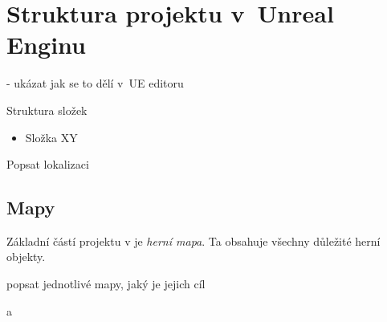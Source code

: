 
\section{Struktura projektu v~Unreal Enginu}
\label{sec:ueStructure}

- ukázat jak se to dělí v~UE editoru

Struktura složek

\begin{itemize}
	\item Složka XY
\end{itemize}

Popsat lokalizaci

\subsection{Mapy}

Základní částí projektu v  je \textit{herní mapa}. Ta obsahuje všechny důležité herní objekty.

popsat jednotlivé mapy, jaký je jejich cíl

a

